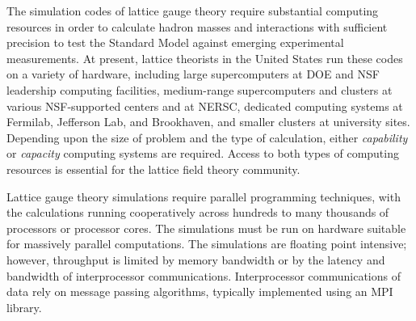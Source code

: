 %

The simulation codes of lattice gauge theory require substantial computing
resources in order to calculate hadron masses and interactions with sufficient
precision to test the Standard Model against emerging experimental
measurements.  At present, lattice theorists in the United States run these
codes on a variety of hardware, including large supercomputers at DOE and NSF
leadership computing facilities, medium-range supercomputers and clusters at
various NSF-supported centers and at NERSC, dedicated computing systems at
Fermilab, Jefferson Lab, and Brookhaven, and smaller clusters at university
sites.  Depending upon the size of problem and the type of calculation, either
{\em capability} or {\em capacity} computing systems are required.  Access to
both types of computing resources is essential for the lattice field theory
community.

Lattice gauge theory simulations require parallel programming techniques, with
the calculations running cooperatively across hundreds to many thousands of
processors or processor cores.  The simulations must be run on hardware suitable
for massively parallel computations. The simulations are floating point intensive;
however, throughput is limited by memory bandwidth or by the latency and
bandwidth of interprocessor communications. Interprocessor communications of
data rely on message passing algorithms, typically implemented using an
MPI~\cite{MPI} library.

